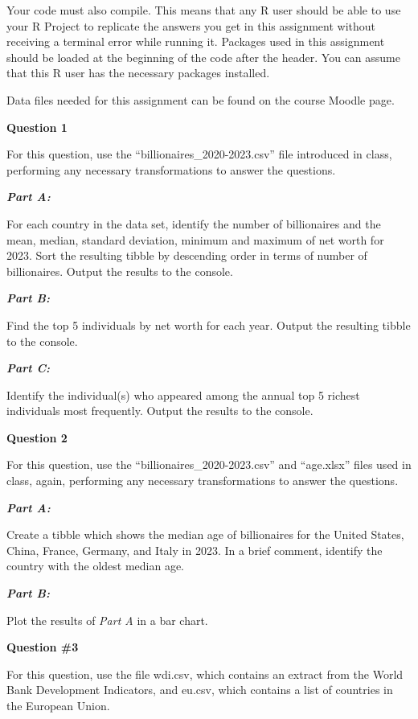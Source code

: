 \documentclass[
  letterpaper,
]{book}
\begin{document}
Your code must also compile. This means that any R user should be able
to use your R Project to replicate the answers you get in this
assignment without receiving a terminal error while running it. Packages
used in this assignment should be loaded at the beginning of the code
after the header. You can assume that this R user has the necessary
packages installed.

Data files needed for this assignment can be found on the course Moodle
page.

\textbf{Question 1}

For this question, use the ``billionaires\_2020-2023.csv'' file
introduced in class, performing any necessary transformations to answer
the questions.

\textbf{\emph{Part A:}}

For each country in the data set, identify the number of billionaires
and the mean, median, standard deviation, minimum and maximum of net
worth for 2023. Sort the resulting tibble by descending order in terms
of number of billionaires. Output the results to the console.

\textbf{\emph{Part B:}}

Find the top 5 individuals by net worth for each year. Output the
resulting tibble to the console.

\textbf{\emph{Part C:}}

Identify the individual(s) who appeared among the annual top 5 richest
individuals most frequently. Output the results to the console.

\textbf{Question 2}

For this question, use the ``billionaires\_2020-2023.csv'' and
``age.xlsx'' files used in class, again, performing any necessary
transformations to answer the questions.

\textbf{\emph{Part A:}}

Create a tibble which shows the median age of billionaires for the
United States, China, France, Germany, and Italy in 2023. In a brief
comment, identify the country with the oldest median age.

\textbf{\emph{Part B:}}

Plot the results of \emph{Part A} in a bar chart.

\textbf{Question \#3}

For this question, use the file wdi.csv, which contains an extract from
the World Bank Development Indicators, and eu.csv, which contains a list
of countries in the European Union.
\end{document}
